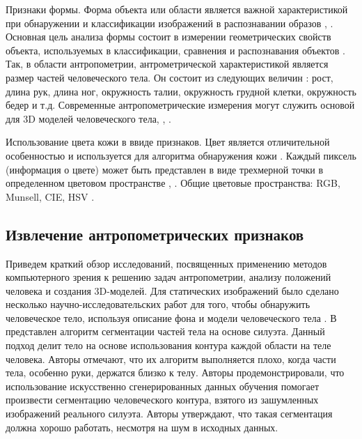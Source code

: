 Признаки формы. Форма объекта или области является важной характеристикой при обнаружении и классификации изображений в распознавании образов \cite{Jones2002}, \cite{Dubinskiy2003}. Основная цель анализа формы состоит в измерении геометрических свойств объекта, используемых в классификации, сравнения и распознавания объектов \cite{Kpalma2006}. Так, в области антропометрии, антрометрической характеристикой является размер частей человеческого тела. Он состоит из следующих величин \cite{urlclothes2015}: рост, длина рук, длина ног, окружность талии, окружность грудной клетки, окружность бедер и т.д. Современные антропометрические измерения могут служить основой для 3D моделей человеческого тела\cite{Toldo2009}, \cite{Ponce1989}, \cite{Zhang2001}.

Использование цвета кожи в ввиде признаков. Цвет является отличительной особенностью и используется для алгоритма обнаружения кожи \cite{Fink2006}. Каждый пиксель (информация о цвете) может быть представлен в виде трехмерной точки в определенном цветовом пространстве \cite{Albio2001}, \cite{Shin2002}. Общие цветовые пространства: RGB, Munsell, CIE, HSV \cite{Jones2002}.

\subsection{Извлечение антропометрических признаков}

Приведем краткий обзор исследований, посвященных применению методов компьютерного зрения к решению задач антропометрии, анализу положений человека и создания 3D-моделей. Для статических изображений было сделано несколько научно-исследовательских работ для того, чтобы обнаружить человеческое тело, используя описание фона и модели человеческого тела \cite{Mori2002}. В \cite{Belongie2002} представлен алгоритм сегментации частей тела на основе силуэта. Данный подход делит тело на основе использования контура каждой области на теле человека. Авторы отмечают, что их алгоритм выполняется плохо, когда части тела, особенно руки, держатся близко к телу. Авторы \cite{Mittal2003} продемонстрировали, что использование искусственно сгенерированных данных обучения помогает произвести сегментацию человеческого контура, взятого из зашумленных изображений реального силуэта. Авторы утверждают, что такая сегментация должна хорошо работать, несмотря на шум в исходных данных.

